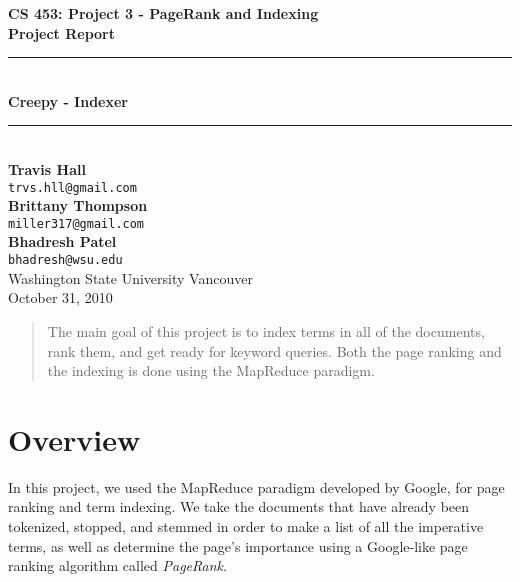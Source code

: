\documentclass[letterpaper,11pt,twoside]{article}
\begin{document}
\begin{titlepage}
   \begin{center}
       {\Large \textbf{CS 453: Project 3 - PageRank and Indexing}}\\[0.5cm]
       {\Large \textbf{Project Report}}\\[3.0cm]

       {\rule{\linewidth}{0.5mm}} \\[0.5cm]
       {\Huge \textbf{Creepy - Indexer}}\\[0.4cm] 
       {\rule{\linewidth}{0.5mm}} \\[2.0cm]

       \textbf{Travis Hall}\\
       \texttt{trvs.hll@gmail.com}\\[0.5cm]
       \textbf{Brittany Thompson}\\
       \texttt{miller317@gmail.com}\\[0.5cm]
       \textbf{Bhadresh Patel}\\
       \texttt{bhadresh@wsu.edu}\\[0.5cm]

       \vfill
       Washington State University Vancouver\\
       October 31, 2010
   \end{center}
\end{titlepage}

\begin{abstract}
The main goal of this project is to index terms in all of the documents, rank them, and get ready for keyword queries. Both the page ranking and the indexing is done using the MapReduce paradigm.
\end{abstract}

\section{Overview}
In this project, we used the MapReduce paradigm developed by Google, for page ranking and term indexing. We take the documents that have already been tokenized, stopped, and stemmed in order to make a list of all the imperative terms, as well as determine the page’s importance using a Google-like page ranking algorithm called \emph{PageRank}.
\end{document}
